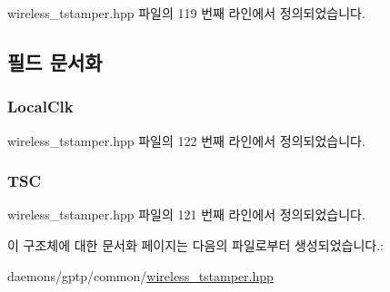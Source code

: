 wireless\+\_\+tstamper.\+hpp 파일의 119 번째 라인에서 정의되었습니다.



\subsection{필드 문서화}
\subsubsection[{\texorpdfstring{Local\+Clk}{LocalClk}}]{ Local\+Clk}\hypertarget{struct___w_i_r_e_l_e_s_s___c_o_r_r_e_l_a_t_e_d_t_i_m_e_a18b6219538a583d472d0057f0828b35e}{}\label{struct___w_i_r_e_l_e_s_s___c_o_r_r_e_l_a_t_e_d_t_i_m_e_a18b6219538a583d472d0057f0828b35e}


wireless\+\_\+tstamper.\+hpp 파일의 122 번째 라인에서 정의되었습니다.

\subsubsection[{\texorpdfstring{T\+SC}{TSC}}]{ T\+SC}\hypertarget{struct___w_i_r_e_l_e_s_s___c_o_r_r_e_l_a_t_e_d_t_i_m_e_a14af96e5d92a73608a9c4999feee9349}{}\label{struct___w_i_r_e_l_e_s_s___c_o_r_r_e_l_a_t_e_d_t_i_m_e_a14af96e5d92a73608a9c4999feee9349}


wireless\+\_\+tstamper.\+hpp 파일의 121 번째 라인에서 정의되었습니다.



이 구조체에 대한 문서화 페이지는 다음의 파일로부터 생성되었습니다.\+:\begin{DoxyCompactItemize}
\item 
daemons/gptp/common/\hyperlink{wireless__tstamper_8hpp}{wireless\+\_\+tstamper.\+hpp}\end{DoxyCompactItemize}
